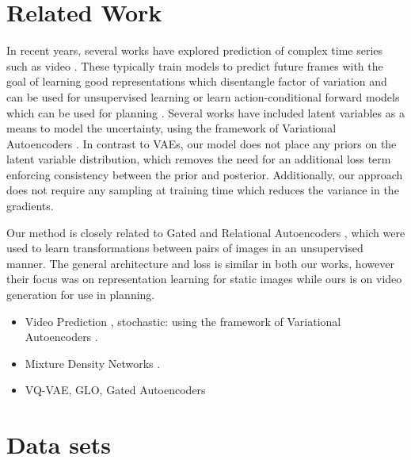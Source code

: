 \documentclass{article}
\begin{document}
\section{Related Work}

In recent years, several works have explored prediction of complex time series such as video \citep{mathieu-iclr-2016,canziani2017cortexnet}.
These typically train models to predict future frames with the goal of learning good representations which disentangle factor of variation and can be used for unsupervised learning \citep{Srivastava15, Villegas17, DentonB17} or learn action-conditional forward models which can be used for planning \citep{Oh15, FinnGL16, Poke, VideoPixel}.
Several works have included latent variables as a means to model the uncertainty, using the framework of Variational Autoencoders \citep{Babaeizadeh2018, Denton2018}.
In contrast to VAEs, our model does not place any priors on the latent variable distribution, which removes the need for an additional loss term enforcing consistency between the prior and posterior.
Additionally, our approach does not require any sampling at training time which reduces the variance in the gradients.

Our method is closely related to Gated and Relational Autoencoders \citep{RelationalAE, GAE}, which were used to learn transformations between pairs of images in an unsupervised manner.
The general architecture and loss is similar in both our works, however their focus was on representation learning for static images while ours is on video generation for use in planning.

\begin{itemize}
\item Video Prediction \citep{mathieu-iclr-2016}, stochastic:  using the framework of Variational Autoencoders \citep{VAE}.
\item Mixture Density Networks \citep{mixture-density-networks}.
\item VQ-VAE, GLO, Gated Autoencoders
\end{itemize}


\section{Data sets}
\end{document}
